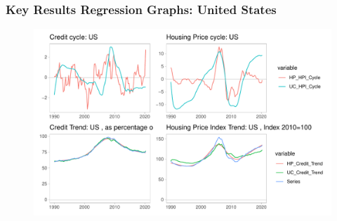\documentclass[10pt]{beamer}
\begin{document}
\begin{frame}[label=Reg_GB]
	\hyperlink{StateSpace}{}		

\end{frame}










\begin{frame}
	\frametitle{Key Results Regression Graphs: United States}
	
	\begin{figure}[H]
		\begin{minipage}{0.95\textwidth} %
			\includegraphics[scale=0.5]{../Regression/VAR_2/Output/Graphs/Combined_US}
		\end{minipage}
	\end{figure}
	
\end{frame}
\end{document}
